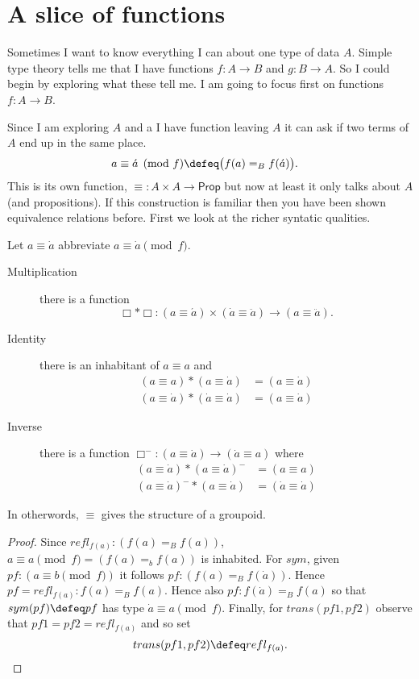 \section{A slice of functions}

Sometimes I want to know everything I can about one type 
of data $A$.  Simple type theory tells me that I have functions 
$f:A\to B$ and $g:B\to A$.  So I could begin by exploring 
what these tell me. I am going to focus first on 
functions $f:A\to B$.  


Since I am exploring $A$ and a I have function leaving $A$
it can ask if two terms of $A$ end up in the same place.
\begin{align*}
    a\equiv \acute{a} \pmod{f} & \defeq 
    \bigl(f(a)=_B f(\acute{a})\bigr).
\end{align*}
This is its own function, $\equiv:A\times A\to \mathsf{Prop}$
but now at least it only talks about $A$ (and propositions).
If this construction is familiar then you have been shown 
equivalence relations before.  First we look at the richer syntatic 
qualities.

\begin{theorem}
    Let $a\equiv \dot{a}$ abbreviate $a\equiv \dot{a}\pmod{f}$.
    \begin{description}
        \item[Multiplication] there is a function 
        \[\Box *\Box :\left(a\equiv \acute{a}\right)
        \times \left(\dot{a}\equiv \ddot{a}\right)
        \longrightarrow 
        \left(a\equiv \ddot{a}\right).\]

        \item[Identity] there is an inhabitant of $a\equiv a$ and 
        \begin{align*}
            (a\equiv a)*(a\equiv \dot{a}) &= (a\equiv \dot{a})\\
            (a\equiv \dot{a})*(\dot{a}\equiv \dot{a}) &= (a\equiv \dot{a})
        \end{align*}
        \item[Inverse] there is a function 
        $\Box^{-}:(a\equiv \dot{a})\rightarrow (\dot{a}\equiv a)$ where 
        \begin{align*}
            (a\equiv \dot{a})*(a\equiv \dot{a})^{-} & = (a\equiv a)\\
            (a\equiv \dot{a})^{-}*(a\equiv \dot{a}) & = (\dot{a}\equiv \dot{a})
        \end{align*}
    \end{description}
    In otherwords, $\equiv$ gives the structure of a groupoid.
\end{theorem}
\begin{proof}
    Since $refl_{f(a)}:(f(a)=_B f(a))$, $a\equiv a\pmod{f}=(f(a)=_b f(a))$
    is inhabited.  For $sym$, given $pf:(a\equiv b\pmod{f})$ it follows 
    $pf:(f(a)=_B f(\dot{a}))$.   Hence $pf=refl_{f(a)}:f(a)=_B f(a)$.
    Hence also $pf:f(\dot{a})=_B f(a)$ so that $sym(pf)\defeq pf$ 
    has type $\dot{a}\equiv a\pmod{f}$.
    Finally, for $trans(pf1,pf2)$ observe that 
    $pf1=pf2=refl_{f(a)}$ and so set 
    \[trans(pf1,pf2)\defeq refl_{f(a)}.\qedhere\]
\end{proof}

